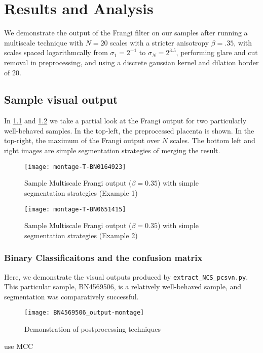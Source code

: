 \chapter{Results and Analysis} \label{ch:results-analysis}

We demonstrate the output of the Frangi filter on our samples after running a multiscale technique with $N=20$ scales with a stricter anisotropy $\beta = .35$,
with scales spaced logarithmcally from $\sigma_1 = 2^{-1}$ to $\sigma_N = 2^{3.5}$, performing glare and cut removal in preprocessing, and using a discrete gaussian kernel and dilation border of 20.

\section{Sample visual output}
In \cref{fig:output-montage-example1} and \cref{fig:output-montage-example2} we take a partial look at the Frangi output for two particularly well-behaved samples. In the top-left, the preprocessed placenta is shown. In the top-right, the maximum of the Frangi output over $N$ scales. The bottom left and right images are simple segmentation strategies of merging the result.

\begin{figure} \centering
  \texttt{[image: montage-T-BN0164923]}
  \caption{Sample Multiscale Frangi output ($\beta=0.35$) with simple segmentation strategies (Example 1)}
  \label{fig:output-montage-example1}
\end{figure}

\begin{figure} \centering
  \texttt{[image: montage-T-BN0651415]}
  \caption{Sample Multiscale Frangi output ($\beta=0.35$) with simple segmentation strategies (Example 2)}
  \label{fig:output-montage-example2}
\end{figure}


\subsection{Binary Classificaitons and the confusion matrix}

Here, we demonstrate the visual outputs produced by \texttt{extract\_NCS\_pcsvn.py}. This particular sample, BN4569506, is a relatively well-behaved sample, and segmentation was comparatively successful.

\begin{figure}
\centering
\texttt{[image: BN4569506\_output-montage]}
\caption{Demonstration of postprocessing techniques}
  \end{figure}
use MCC \cite{mcc-original-paper}



